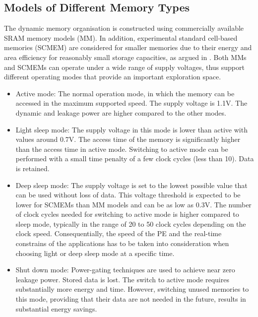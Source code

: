 \documentclass[a4paper,conference]{IEEEtran}
\begin{document}
\subsection{Models of Different Memory Types}
The dynamic memory organisation is constructed using commercially available SRAM memory models (MM). In addition, experimental standard cell-based memories (SCMEM) \cite{Mei11}  are  considered for smaller memories due to their energy and area efficiency for reasonably small storage capacities, as argued in \cite{Mei10}. Both MMs and SCMEMs can operate under a wide range of supply voltages, thus support different operating modes that provide an important exploration space.
\begin{itemize}
\item Active mode: The normal operation mode, in which the memory can be accessed in the maximum supported speed. The supply voltage is 1.1V. The dynamic and leakage power are higher compared to the other modes.
\item Light sleep mode: The supply voltage in this mode is lower than active with values around 0.7V. The access time of the memory is significantly higher than the access time in active mode. Switching to active mode can be performed with a small time penalty of a few clock cycles (less than 10). Data is retained.  
\item Deep sleep mode: The supply voltage is set to the lowest possible value that can be used without loss of data. This voltage threshold is expected to be lower for SCMEMs than MM models and can be as low as 0.3V. The number of clock cycles needed for switching to active mode is higher compared to sleep mode, typically in the range of 20 to 50 clock cycles depending on the clock speed. Consequentially, the speed of the PE and the real-time constrains of the applications has to be taken into consideration when choosing light or deep sleep mode at a specific time.  
\item Shut down mode: Power-gating techniques are used to achieve near zero leakage power. Stored data is lost. The switch to active mode requires substantially more energy and time. However, switching unused memories to this mode, providing that their data are not needed in the future, results in substantial energy savings.
\end{itemize}  
\end{document}
